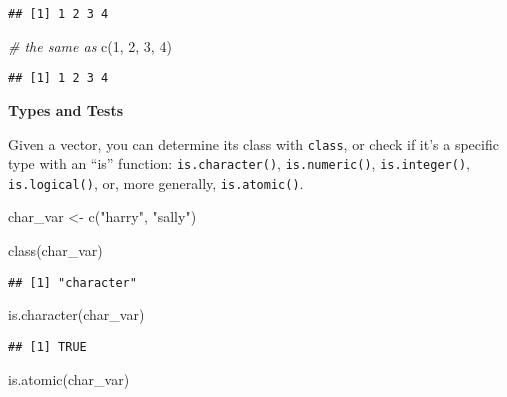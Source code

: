 \documentclass[
]{book}
\newenvironment{Shaded}{\begin{snugshade}}{\end{snugshade}}
\newcommand{\CommentTok}[1]{\textcolor[rgb]{0.56,0.35,0.01}{\textit{#1}}}
\newcommand{\DecValTok}[1]{\textcolor[rgb]{0.00,0.00,0.81}{#1}}
\newcommand{\FunctionTok}[1]{\textcolor[rgb]{0.00,0.00,0.00}{#1}}
\newcommand{\NormalTok}[1]{#1}
\newcommand{\OtherTok}[1]{\textcolor[rgb]{0.56,0.35,0.01}{#1}}
\newcommand{\StringTok}[1]{\textcolor[rgb]{0.31,0.60,0.02}{#1}}
\begin{document}
\begin{verbatim}
## [1] 1 2 3 4
\end{verbatim}

\begin{Shaded}
\begin{Highlighting}[]
\CommentTok{\# the same as}
\FunctionTok{c}\NormalTok{(}\DecValTok{1}\NormalTok{, }\DecValTok{2}\NormalTok{, }\DecValTok{3}\NormalTok{, }\DecValTok{4}\NormalTok{)}
\end{Highlighting}
\end{Shaded}

\begin{verbatim}
## [1] 1 2 3 4
\end{verbatim}

\textbf{Types and Tests}

Given a vector, you can determine its class with \texttt{class}, or check if it's a specific type with an ``is'' function: \texttt{is.character()}, \texttt{is.numeric()}, \texttt{is.integer()}, \texttt{is.logical()}, or, more generally, \texttt{is.atomic()}.

\begin{Shaded}
\begin{Highlighting}[]
\NormalTok{char\_var }\OtherTok{\textless{}{-}} \FunctionTok{c}\NormalTok{(}\StringTok{"harry"}\NormalTok{, }\StringTok{"sally"}\NormalTok{)}

\FunctionTok{class}\NormalTok{(char\_var)}
\end{Highlighting}
\end{Shaded}

\begin{verbatim}
## [1] "character"
\end{verbatim}

\begin{Shaded}
\begin{Highlighting}[]
\FunctionTok{is.character}\NormalTok{(char\_var)}
\end{Highlighting}
\end{Shaded}

\begin{verbatim}
## [1] TRUE
\end{verbatim}

\begin{Shaded}
\begin{Highlighting}[]
\FunctionTok{is.atomic}\NormalTok{(char\_var)}
\end{Highlighting}
\end{Shaded}
\end{document}
